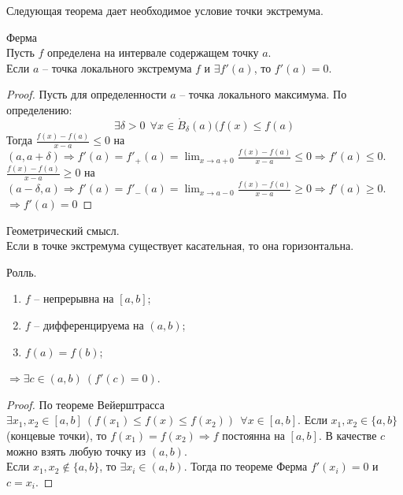 Следующая теорема дает необходимое условие точки экстремума.

\begin{theorem}{Ферма}\\
    Пусть $f$ определена на интервале содержащем точку $a$.\\
    Если $a$ -- точка локального экстремума $f$ и $\exists f'(a)$, то $f'(a) = 0$.
\end{theorem}

\begin{proof}
    Пусть для определенности $a$ -- точка локального максимума. По определению:
    \[\exists \delta > 0 \ \ \forall x \in \mathring{B}_{\delta}(a) (f(x) \leq f(a)\]
    Тогда $\frac{f(x) - f(a)}{x - a} \leq 0$ на $(a, a + \delta) \Rightarrow f'(a) = f'_{+}(a) = \lim_{x \to a + 0}\frac{f(x) - f(a)}{x - a} \leq 0 \Rightarrow f'(a) \leq 0$.\\
    $\frac{f(x) - f(a)}{x - a} \geq 0$ на $(a - \delta, a) \Rightarrow f'(a) = f'_{-}(a) = \lim_{x \to a - 0}\frac{f(x) - f(a)}{x - a} \geq 0 \Rightarrow f'(a) \geq 0$.
    \\
    $\Rightarrow f'(a) = 0$
\end{proof}

\begin{note}{Геометрический смысл.}\\
    Если в точке экстремума существует касательная, то она горизонтальна.
\end{note}

\begin{theorem}{Ролль.}
    \begin{enumerate}
        \item $f$ -- непрерывна на $[a,b]$;
        \item $f$ -- дифференцируема на $(a,b)$;
        \item $f(a) = f(b)$;
    \end{enumerate}
    $\Rightarrow \exists c \in (a,b) \ (f'(c) = 0)$.
\end{theorem}

\begin{proof}
    По теореме Вейерштрасса $\exists x_{1}, x_{2} \in [a,b] \ (f(x_{1}) \leq f(x) \leq f(x_{2})) \ \ \forall x \in [a,b]$.
    Если $x_{1}, x_{2} \in \{a,b\}$ (концевые точки), то $f(x_{1})=f(x_{2}) \Rightarrow f$ постоянна на $[a,b]$. В качестве $c$ можно взять любую точку из $(a,b)$.
    \\
    Если $x_{1}, x_{2} \notin \{a,b\}$, то $\exists x_{i} \in (a,b)$. Тогда по теореме Ферма $f'(x_{i}) = 0$ и $c = x_{i}$.
\end{proof}

